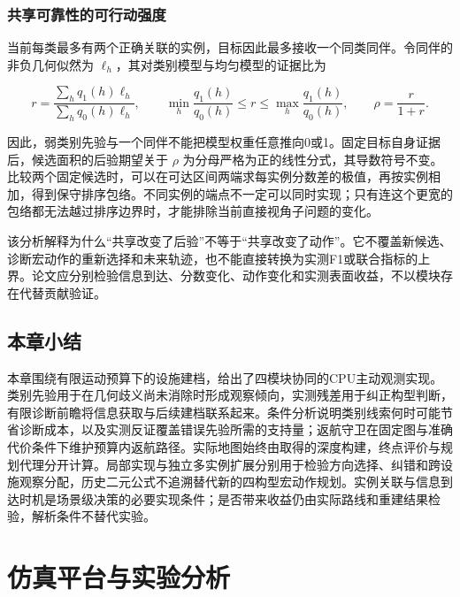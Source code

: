 \documentclass[11pt,a4paper]{article}
\numberwithin{equation}{section}
\begin{document}
\hypertarget{ux5171ux4eabux53efux9760ux6027ux7684ux53efux884cux52a8ux5f3aux5ea6}{%
\subsubsection{共享可靠性的可行动强度}\label{ux5171ux4eabux53efux9760ux6027ux7684ux53efux884cux52a8ux5f3aux5ea6}}

当前每类最多有两个正确关联的实例，目标因此最多接收一个同类同伴。令同伴的非负几何似然为 \(\ell_h\)，其对类别模型与均匀模型的证据比为

\begin{equation}
r=\frac{\sum_hq_1(h)\ell_h}{\sum_hq_0(h)\ell_h},\qquad
\min_h\frac{q_1(h)}{q_0(h)}\le r\le\max_h\frac{q_1(h)}{q_0(h)},\qquad
\rho=\frac{r}{1+r}.
\end{equation}

因此，弱类别先验与一个同伴不能把模型权重任意推向0或1。固定目标自身证据后，候选面积的后验期望关于 \(\rho\) 为分母严格为正的线性分式，其导数符号不变。比较两个固定候选时，可以在可达区间两端求每实例分数差的极值，再按实例相加，得到保守排序包络。不同实例的端点不一定可以同时实现；只有连这个更宽的包络都无法越过排序边界时，才能排除当前直接视角子问题的变化。

该分析解释为什么``共享改变了后验''不等于``共享改变了动作''。它不覆盖新候选、诊断宏动作的重新选择和未来轨迹，也不能直接转换为实测F1或联合指标的上界。论文应分别检验信息到达、分数变化、动作变化和实测表面收益，不以模块存在代替贡献验证。

\hypertarget{ux672cux7ae0ux5c0fux7ed3-1}{%
\subsection{本章小结}\label{ux672cux7ae0ux5c0fux7ed3-1}}

本章围绕有限运动预算下的设施建档，给出了四模块协同的CPU主动观测实现。类别先验用于在几何歧义尚未消除时形成观察倾向，实测残差用于纠正构型判断，有限诊断前瞻将信息获取与后续建档联系起来。条件分析说明类别线索何时可能节省诊断成本，以及实测反证覆盖错误先验所需的支持量；返航守卫在固定图与准确代价条件下维护预算内返航路径。实际地图始终由取得的深度构建，终点评价与规划代理分开计算。局部实现与独立多实例扩展分别用于检验方向选择、纠错和跨设施观察分配，历史二元公式不追溯替代新的四构型宏动作规划。实例关联与信息到达时机是场景级决策的必要实现条件；是否带来收益仍由实际路线和重建结果检验，解析条件不替代实验。

\hypertarget{ux4effux771fux5e73ux53f0ux4e0eux5b9eux9a8cux5206ux6790}{%
\clearpage
\section{仿真平台与实验分析}\label{ux4effux771fux5e73ux53f0ux4e0eux5b9eux9a8cux5206ux6790}}
\end{document}
